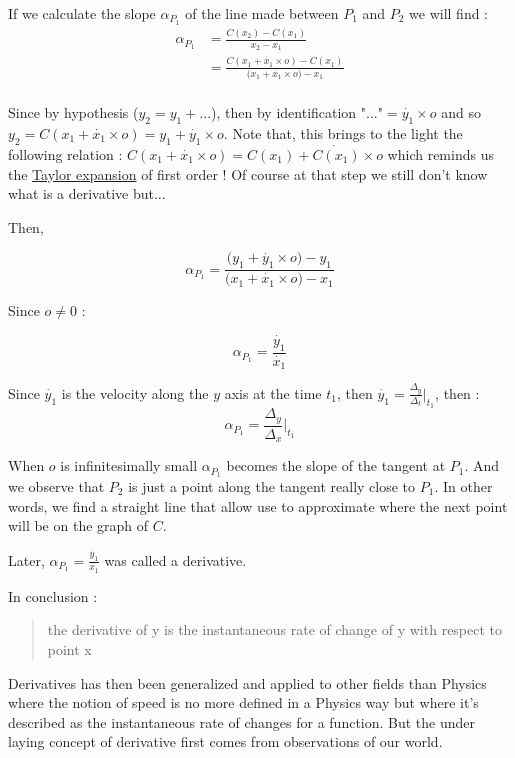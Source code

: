 \documentclass[12pt]{article}
\begin{document}
If we calculate the slope $\alpha_{P_1}$ of the line made between $P_1$ and $P_2$ we will find :
\begin{equation*}
    \begin{split}
        \alpha_{P_1} &= \frac{C(x_2)-C(x_1)}{x_2-x_1} \\
                    &= \frac{ C(x_1 + \dot{x_1} \times o) -C(x_1)}{\big( x_1 + \dot{x_1} \times o \big) -x_1} \\
    \end{split}
\end{equation*}

Since by hypothesis ($y_2 = y_1 + ...$), then by identification $\text{"..."} = \dot{y_1} \times o$ and so $y_2=C(x_1 + \dot{x_1} \times o)=y_1 + \dot{y_1} \times o$. Note that, this brings to the light the following relation : $C(x_1 + \dot{x_1} \times o) = C(x_1) + \dot{C(x_1)} \times o$ which reminds us the \href{https://en.wikipedia.org/wiki/Taylor_series}{Taylor expansion} of first order ! Of course at that step we still don't know what is a derivative but...

Then, 

\begin{equation*}
\alpha_{P_1} = \frac{ \big( y_1 + \dot{y_1} \times o \big) - y_1}{\big( x_1 + \dot{x_1} \times o \big) -x_1}
\end{equation*}

Since $o \neq 0$ : 

$$
\alpha_{P_1} = \frac{\dot{y_1}}{\dot{x_1}}
$$

Since $\dot{y_1}$ is the velocity along the $y$ axis at the time $t_1$, then $\dot{y_1} = \frac{\Delta_y}{\Delta_t}|_{t_1}$, then :
$$
\alpha_{P_1} = \frac{\Delta_y}{\Delta_x} \big|_{t_1}
$$

When $o$ is infinitesimally small $\alpha_{P_1}$ becomes the slope of the tangent at $P_1$. And we observe that $P_2$ is just a point along the tangent really close to $P_1$. In other words, we find a straight line that allow use to approximate where the next point will be on the graph of $C$.

Later, $\alpha_{P_1} = \frac{\dot{y_1}}{\dot{x_1}}$ was called a derivative.

\bigskip

In conclusion :
\begin{quote}
the derivative of y is the instantaneous rate of change of y with respect to point x
\end{quote}

Derivatives has then been generalized and applied to other fields than Physics where the notion of speed is no more defined in a Physics way but where it's described as the instantaneous rate of changes for a function. But the under laying concept of derivative first comes from observations of our world.
\end{document}
